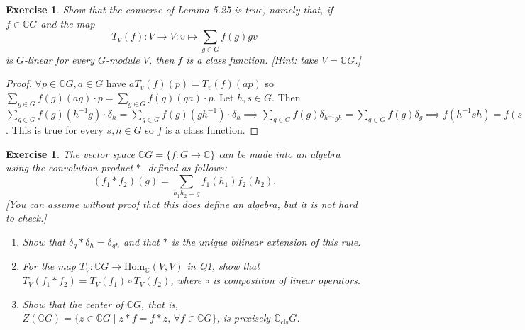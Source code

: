 \documentclass{article}
\newtheorem{exercise}[theorem]{Exercise}
\begin{document}
\begin{exercise}
 Show that the converse of Lemma 5.25 is true, namely that, if \( f \in \mathbb{C}G \) and the map
    \[
    T_V(f) : V \to V : v \mapsto \sum_{g \in G} f(g)gv
    \]
    is \( G \)-linear for every \( G \)-module \( V \), then \( f \) is a class function. [Hint: take \( V = \mathbb{C}G \).]
\end{exercise}
\begin{proof}
$\forall p\in \mathbb{C}G,a\in G$ have $aT_v(f)(p)=T_v(f)(ap)$ so $\sum_{g\in G}f(g)(ag)\cdot p=\sum_{g\in G}f(g)(ga)\cdot p$. Let $h,s\in G$. Then $\sum_{g\in G}f(g)(h^{-1}g)\cdot \delta_h=\sum_{g\in G}f(g)(gh^{-1})\cdot \delta_h\implies \sum_{g\in G}f(g)\delta_{h^{-1}gh}=\sum_{g\in G}f(g)\delta_{g}\implies f(h^{-1}sh)=f(s)$. This is true for every $s,h\in G$ so $f$ is a class function.
\end{proof}
\begin{exercise}
    The vector space \( \mathbb{C}G = \{ f : G \to \mathbb{C} \} \) can be made into an algebra using the convolution product \( * \), defined as follows:
    \[
    (f_1 * f_2)(g) = \sum_{h_1h_2 = g} f_1(h_1)f_2(h_2).
    \]
    [You can assume without proof that this does define an algebra, but it is not hard to check.]

    \begin{enumerate}
        \item Show that \( \delta_g * \delta_h = \delta_{gh} \) and that \( * \) is the unique bilinear extension of this rule.
        \item For the map \( T_V : \mathbb{C}G \to \text{Hom}_{\mathbb{C}}(V, V) \) in Q1, show that \( T_V(f_1 * f_2) = T_V(f_1) \circ T_V(f_2) \), where \( \circ \) is composition of linear operators.
        \item Show that the center of \( \mathbb{C}G \), that is, \( Z(\mathbb{C}G) = \{ z \in \mathbb{C}G \mid z * f = f * z, \, \forall f \in \mathbb{C}G \} \), is precisely \( \mathbb{C}_\text{cls}G \).
    \end{enumerate}
\end{exercise}
\end{document}
